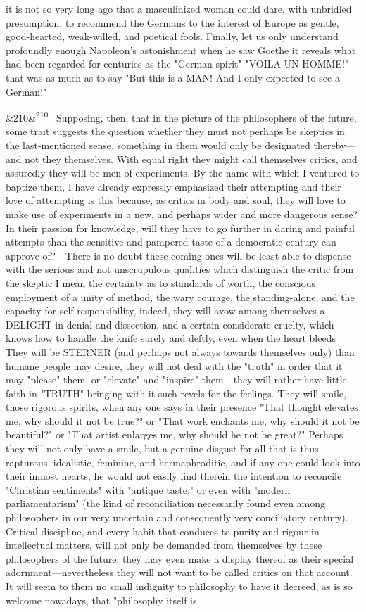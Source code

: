 \documentclass[12pt]{article}
\newcommand{\para}[1][]{\par\noindent\ifx&#1&\else\textsuperscript{\footnotesize #1}~\fi}
\begin{document}
it is not so very long ago that a masculinized woman could dare, with unbridled presumption, to recommend the Germans to the interest of Europe as gentle, good-hearted, weak-willed, and poetical fools. Finally, let us only understand profoundly enough Napoleon's astonishment when he saw Goethe it reveals what had been regarded for centuries as the "German spirit" "VOILA UN HOMME!"---that was as much as to say "But this is a MAN! And I only expected to see a German!"

\para[210] Supposing, then, that in the picture of the philosophers of the future, some trait suggests the question whether they must not perhaps be skeptics in the last-mentioned sense, something in them would only be designated thereby---and not they themselves. With equal right they might call themselves critics, and assuredly they will be men of experiments. By the name with which I ventured to baptize them, I have already expressly emphasized their attempting and their love of attempting is this because, as critics in body and soul, they will love to make use of experiments in a new, and perhaps wider and more dangerous sense? In their passion for knowledge, will they have to go further in daring and painful attempts than the sensitive and pampered taste of a democratic century can approve of?---There is no doubt these coming ones will be least able to dispense with the serious and not unscrupulous qualities which distinguish the critic from the skeptic I mean the certainty as to standards of worth, the conscious employment of a unity of method, the wary courage, the standing-alone, and the capacity for self-responsibility, indeed, they will avow among themselves a DELIGHT in denial and dissection, and a certain considerate cruelty, which knows how to handle the knife surely and deftly, even when the heart bleeds They will be STERNER (and perhaps not always towards themselves only) than humane people may desire, they will not deal with the "truth" in order that it may "please" them, or "elevate" and "inspire" them---they will rather have little faith in "TRUTH" bringing with it such revels for the feelings. They will smile, those rigorous spirits, when any one says in their presence "That thought elevates me, why should it not be true?" or "That work enchants me, why should it not be beautiful?" or "That artist enlarges me, why should he not be great?" Perhaps they will not only have a smile, but a genuine disgust for all that is thus rapturous, idealistic, feminine, and hermaphroditic, and if any one could look into their inmost hearts, he would not easily find therein the intention to reconcile "Christian sentiments" with "antique taste," or even with "modern parliamentarism" (the kind of reconciliation necessarily found even among philosophers in our very uncertain and consequently very conciliatory century). Critical discipline, and every habit that conduces to purity and rigour in intellectual matters, will not only be demanded from themselves by these philosophers of the future, they may even make a display thereof as their special adornment---nevertheless they will not want to be called critics on that account. It will seem to them no small indignity to philosophy to have it decreed, as is so welcome nowadays, that "philosophy itself is 
\end{document}
